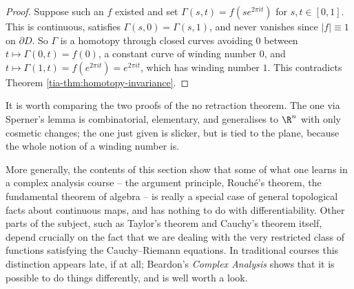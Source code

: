 \begin{proof}
	Suppose such an $f$ existed and set $\Gamma(s,t) = f(se^{2\pi it})$ for $s,t\in[0,1]$. This is continuous, satisfies $\Gamma(s,0)=\Gamma(s,1)$, and never vanishes since $|f|\equiv1$ on $\partial D$. So $\Gamma$ is a homotopy through closed curves avoiding $0$ between $t\mapsto\Gamma(0,t) = f(0)$, a constant curve of winding number $0$, and $t\mapsto\Gamma(1,t)=f(e^{2\pi it}) = e^{2\pi it}$, which has winding number $1$. This contradicts Theorem \ref{tia-thm:homotopy-invariance}.
\end{proof}

It is worth comparing the two proofs of the no retraction theorem. The one via Sperner's lemma is combinatorial, elementary, and generalises to $\R^n$ with only cosmetic changes; the one just given is slicker, but is tied to the plane, because the whole notion of a winding number is.

More generally, the contents of this section show that some of what one learns in a complex analysis course -- the argument principle, Rouch\'e's theorem, the fundamental theorem of algebra -- is really a special case of general topological facts about continuous maps, and has nothing to do with differentiability. Other parts of the subject, such as Taylor's theorem and Cauchy's theorem itself, depend crucially on the fact that we are dealing with the very restricted class of functions satisfying the Cauchy--Riemann equations. In traditional courses this distinction appears late, if at all; Beardon's \emph{Complex Analysis} shows that it is possible to do things differently, and is well worth a look.

